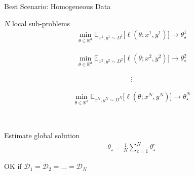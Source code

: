 \documentclass[aspectratio=169,14pt]{beamer}
\begin{document}
\begin{frame}{Best Scenario: Homogeneous Data}

  \begin{minipage}[t]{0.5\linewidth}
    $N$ local sub-problems
    \small
    \begin{align*}
      \min_{\theta \in \mathbb{R}^d}
      \mathbb{E}_{x^1, y^1 \sim D^1} \Big[ \ell( \theta; x^1, y^1 ) \Big]
      \rightarrow
      \theta_\star^1
    \end{align*}

    \vspace{-2em}
    
    \begin{align*}
      \min_{\theta \in \mathbb{R}^d}
      \mathbb{E}_{x^2, y^2 \sim D^2} \Big[ \ell( \theta; x^2, y^2 ) \Big]
      \rightarrow
      \theta_\star^2
    \end{align*}

    \vspace{-2em}

    \begin{align*}
      \vdots
    \end{align*}

    \vspace{-2em}
    
    \begin{align*}
      \min_{\theta \in \mathbb{R}^d} 
      \mathbb{E}_{x^N, y^N \sim D^N} \Big[ \ell( \theta; x^N, y^N ) \Big]
      \rightarrow
      \theta_\star^N
    \end{align*}
  \end{minipage}~~~~%
  \begin{minipage}[t]{0.45\linewidth}
    \pause
    
    Estimate global solution
    \begin{align*}
      \theta_\star
      = \frac{1}{N} \sum_{c=1}^N \theta_\star^c
    \end{align*}

    OK if $\mathcal{D}_1 = \mathcal{D}_2 = \dots = \mathcal{D}_N$ 
  \end{minipage}
  
\end{frame}
\end{document}
